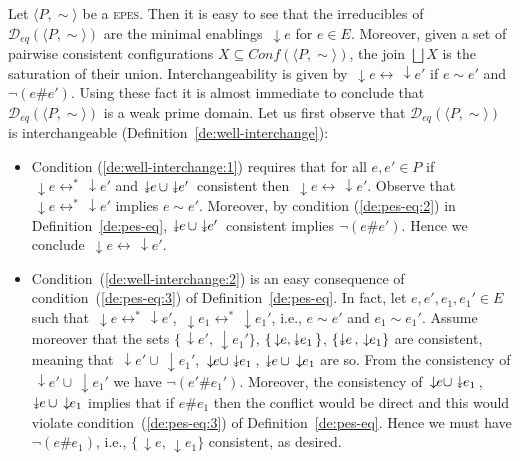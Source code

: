 \documentclass[conference]{IEEEtran}
\renewenvironment{proof}{\begin{IEEEproof}}{\end{IEEEproof}}
\newcommand{\wi}{{interchangeable}}
\newcommand{\eseqabbr}{\textsc{epes}}
\newcommand{\conf}[1]{\ensuremath{\mathit{Conf}({#1})}}
\newcommand{\zdomeq}[0]{\ensuremath{\mathcal{D}_{eq}}}
\newcommand{\domeq}[1]{\ensuremath{\zdomeq({#1})}}
\newcommand\twoheaddownarrow{\mathrel{\raisebox{0.8\depth}{\rotatebox{270}{$\twoheadrightarrow$}}}}
\newcommand{\scauses}[1]{\ensuremath{\twoheaddownarrow\!\!{#1}\,}}
\newcommand{\causes}[1]{\ensuremath{\,\downarrow\!\!{#1}}}
\begin{document}
\begin{proof}
  Let $\langle P, \sim \rangle$ be a {\eseqabbr}.
  Then it is easy to see that the irreducibles of
  $\domeq{\langle P, \sim \rangle}$ are the minimal enablings
  $\causes{e}$ for $e \in E$.
  Moreover, given a set of pairwise consistent configurations
  $X \subseteq \conf{\langle P, \sim \rangle}$, the join $\bigsqcup X$
  is the saturation of their union.
  Interchangeability is given by
  $\causes{e} \leftrightarrow \causes{e'}$
  if $e \sim e'$ and $\neg (e \# e')$.
  Using these fact it is almost immediate to conclude that
    $\domeq{\langle P, \sim \rangle}$ is a weak prime domain. Let us
    first observe that $\domeq{\langle P, \sim \rangle}$ is
    {\wi} (Definition~\ref{de:well-interchange}):
    \begin{itemize}
    \item Condition (\ref{de:well-interchange:1}) requires that for
      all $e, e' \in P$ if $\causes{e} \leftrightarrow^* \causes{e'}$
      and $\scauses{e} \cup \scauses{e'}$ consistent then
      $\causes{e} \leftrightarrow \causes{e'}$. Observe that
      $\causes{e} \leftrightarrow^* \causes{e'}$ implies $e \sim
      e'$. Moreover, by condition (\ref{de:pes-eq:2}) in
      Definition~\ref{de:pes-eq}, $\scauses{e} \cup \scauses{e'}$
      consistent implies $\neg (e \# e')$. Hence we conclude
      $\causes{e} \leftrightarrow \causes{e'}$.

    
    \item Condition~(\ref{de:well-interchange:2}) is an easy
      consequence of condition~(\ref{de:pes-eq:3}) of
      Definition~\ref{de:pes-eq}. In fact, let
      $e, e', e_1, e_1' \in E$ such that
      $\causes{e} \leftrightarrow^* \causes{e'}$,
      $\causes{e_1} \leftrightarrow^* \causes{e_1'}$, i.e.,
      $e \sim e'$ and $e_1 \sim e_1'$. Assume moreover that the sets
      $\{ \causes{e'}, \causes{e_1'}\}$,
      $\{ \causes{e}, \scauses{e_1}\}$,
      $\{ \scauses{e}, \causes{e_1}\}$ are consistent, meaning that $\causes{e'} \cup \causes{e_1'}$, $\causes{e} \cup \scauses{e_1}$, 
      $\scauses{e} \cup \causes{e_1}$ are so. From the consistency of $\causes{e'} \cup \causes{e_1'}$ we have $\neg (e' \# e_1')$. Moreover, the consistency of $\causes{e} \cup \scauses{e_1}$, 
      $\scauses{e} \cup \causes{e_1}$ implies that if $e \# e_1$ then the conflict would be direct and  this would violate condition~(\ref{de:pes-eq:3}) of
      Definition~\ref{de:pes-eq}. Hence we must have $\neg (e \# e_1)$, i.e., $\{  \causes{e}, \causes{e_1}\}$ consistent, as desired.
    \end{itemize}


\end{proof}
\end{document}
